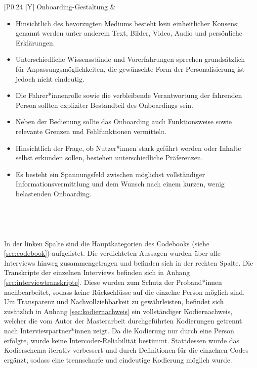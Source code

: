 {\begin{xltabular}{\textwidth}{
    |P{0.24\textwidth}
    |Y|
}
Onboarding-Gestaltung &
\begin{itemize}[leftmargin=*,nosep]
    \item Hinsichtlich des bevorzugten Mediums besteht kein einheitlicher Konsens; genannt werden unter anderem Text, Bilder, Video, Audio und persönliche Erklärungen.
    \item Unterschiedliche Wissensstände und Vorerfahrungen sprechen grundsätzlich für Anpassungsmöglichkeiten, die gewünschte Form der Personalisierung ist jedoch nicht eindeutig.
    \item Die Fahrer*innenrolle sowie die verbleibende Verantwortung der fahrenden Person sollten expliziter Bestandteil des Onboardings sein.
    \item Neben der Bedienung sollte das Onboarding auch Funktionsweise sowie relevante Grenzen und Fehlfunktionen vermitteln.
    \item Hinsichtlich der Frage, ob Nutzer*innen stark geführt werden oder Inhalte selbst erkunden sollen, bestehen unterschiedliche Präferenzen.
    \item Es besteht ein Spannungsfeld zwischen möglichst vollständiger Informationsvermittlung und dem Wunsch nach einem kurzen, wenig belastenden Onboarding.
\end{itemize}
\\
\hline

\caption{Kategorienbasierte Verdichtung der Ergebnisse der qualitativen Nutzer*inneninterviews}
\label{tab:kategorienbasierte-auswertung}
\\

\end{xltabular}
}

In der linken Spalte sind die Hauptkategorien des Codebooks (siehe \ref{sec:codebook}) aufgelistet. Die verdichteten Aussagen wurden über alle Interviews hinweg zusammengetragen und befinden sich in der rechten Spalte. Die Transkripte der einzelnen Interviews befinden sich in Anhang \ref{sec:interviewtranskripte}. Diese wurden zum Schutz der Proband*innen nachbearbeitet, sodass keine Rückschlüsse auf die einzelne Person möglich sind. Um Transparenz und Nachvollziehbarkeit zu gewährleisten, befindet sich zusätzlich in Anhang \ref{sec:kodiernachweis} ein vollständiger Kodiernachweis, welcher die vom Autor der Masterarbeit durchgeführten Kodierungen getrennt nach Interviewpartner*innen zeigt. Da die Kodierung nur durch eine Person erfolgte, wurde keine Intercoder-Reliabilität \cite{cohen1960coefficient} bestimmt. Stattdessen wurde das Kodierschema iterativ verbessert und durch Definitionen für die einzelnen Codes ergänzt, sodass eine trennscharfe und eindeutige Kodierung möglich wurde.  

